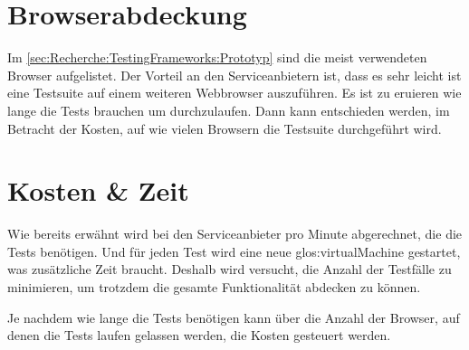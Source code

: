 \section{Browserabdeckung}
Im \cref{sec:Recherche:TestingFrameworks:Prototyp}  sind die meist verwendeten Browser aufgelistet. Der Vorteil an den Serviceanbietern ist, dass es sehr leicht ist eine Testsuite auf einem weiteren Webbrowser auszuführen. Es ist zu eruieren wie lange die Tests brauchen um durchzulaufen. Dann kann entschieden werden, im Betracht der Kosten, auf wie vielen Browsern die Testsuite durchgeführt wird.

\section{Kosten \& Zeit}
Wie bereits erwähnt wird bei den Serviceanbieter pro Minute abgerechnet, die die Tests benötigen. Und für jeden Test wird eine neue \Gls{glos:virtualMachine} gestartet, was zusätzliche Zeit braucht. Deshalb wird versucht, die Anzahl der Testfälle zu minimieren, um trotzdem die gesamte Funktionalität abdecken zu können.

Je nachdem wie lange die Tests benötigen kann über die Anzahl der Browser, auf denen die Tests laufen gelassen werden, die Kosten gesteuert werden.